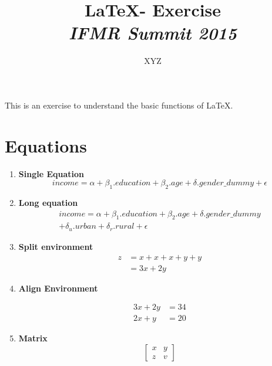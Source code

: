 \documentclass{article}
\begin{document}
	\title{\textbf{\LaTeX - Exercise} \\
	\textbf{\small{\emph{IFMR Summit 2015}}}}
	
	\author{XYZ}
	\maketitle
	
	\begin{center}
	This is an exercise to understand the basic functions of \LaTeX. 
	\end{center}
	
	\newpage
	\tableofcontents
	\newpage
	
	
\section{Equations}
	\begin{enumerate}
		\item \textbf{Single Equation}
			\begin{equation}
			income =  \alpha + \beta_1 . education + \beta_2 . age + \delta . gender\_dummy + \epsilon
			\end{equation}
			
		\item \textbf{Long equation}
			\begin{multline*}
					income =  \alpha + \beta_1 . education + \beta_2 . age + \delta . gender\_dummy\\
					+ \delta_u . urban + \delta_r . rural + \epsilon
			\end{multline*}
			
		\item \textbf{Split environment}
		\begin{equation}
		\begin{split}
			z &= x + x + x + y + y \\
			  &= 3x + 2y
		\end{split}
		\end{equation}
		
		\item \textbf{Align Environment}
		
			\begin{align*}
			 3x + 2y &= 34 \\
			 2x + y  &= 20 
			\end{align*}
	
				\item \textbf{Matrix} \\
				
				\[
				\begin{bmatrix}
					x & y \\
					z & v
				\end{bmatrix}
				\]
				
	\end{enumerate}
	
\end{document}
